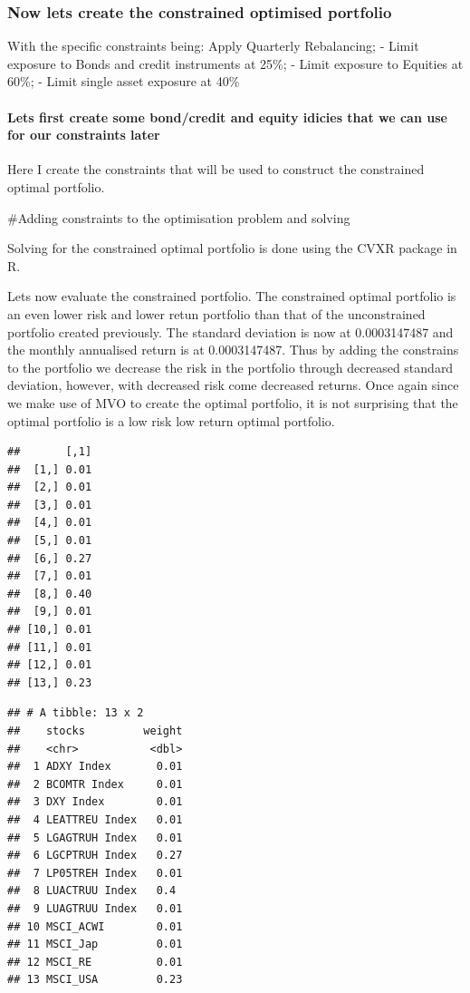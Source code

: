 \documentclass[11pt,preprint, authoryear]{elsarticle}
\numberwithin{equation}{section}
\numberwithin{figure}{section}
\numberwithin{table}{section}
\begin{document}
\hypertarget{now-lets-create-the-constrained-optimised-portfolio}{%
\subsubsection{Now lets create the constrained optimised
portfolio}\label{now-lets-create-the-constrained-optimised-portfolio}}

With the specific constraints being: Apply Quarterly Rebalancing; -
Limit exposure to Bonds and credit instruments at 25\%; - Limit exposure
to Equities at 60\%; - Limit single asset exposure at 40\%

\hypertarget{lets-first-create-some-bondcredit-and-equity-idicies-that-we-can-use-for-our-constraints-later}{%
\paragraph{Lets first create some bond/credit and equity idicies that we
can use for our constraints
later}\label{lets-first-create-some-bondcredit-and-equity-idicies-that-we-can-use-for-our-constraints-later}}

Here I create the constraints that will be used to construct the
constrained optimal portfolio.

\#Adding constraints to the optimisation problem and solving

Solving for the constrained optimal portfolio is done using the CVXR
package in R.

Lets now evaluate the constrained portfolio. The constrained optimal
portfolio is an even lower risk and lower retun portfolio than that of
the unconstrained portfolio created previously. The standard deviation
is now at 0.0003147487 and the monthly annualised return is at
0.0003147487. Thus by adding the constrains to the portfolio we decrease
the risk in the portfolio through decreased standard deviation, however,
with decreased risk come decreased returns. Once again since we make use
of MVO to create the optimal portfolio, it is not surprising that the
optimal portfolio is a low risk low return optimal portfolio.

\begin{verbatim}
##       [,1]
##  [1,] 0.01
##  [2,] 0.01
##  [3,] 0.01
##  [4,] 0.01
##  [5,] 0.01
##  [6,] 0.27
##  [7,] 0.01
##  [8,] 0.40
##  [9,] 0.01
## [10,] 0.01
## [11,] 0.01
## [12,] 0.01
## [13,] 0.23
\end{verbatim}

\begin{verbatim}
## # A tibble: 13 x 2
##    stocks         weight
##    <chr>           <dbl>
##  1 ADXY Index       0.01
##  2 BCOMTR Index     0.01
##  3 DXY Index        0.01
##  4 LEATTREU Index   0.01
##  5 LGAGTRUH Index   0.01
##  6 LGCPTRUH Index   0.27
##  7 LP05TREH Index   0.01
##  8 LUACTRUU Index   0.4 
##  9 LUAGTRUU Index   0.01
## 10 MSCI_ACWI        0.01
## 11 MSCI_Jap         0.01
## 12 MSCI_RE          0.01
## 13 MSCI_USA         0.23
\end{verbatim}
\end{document}

